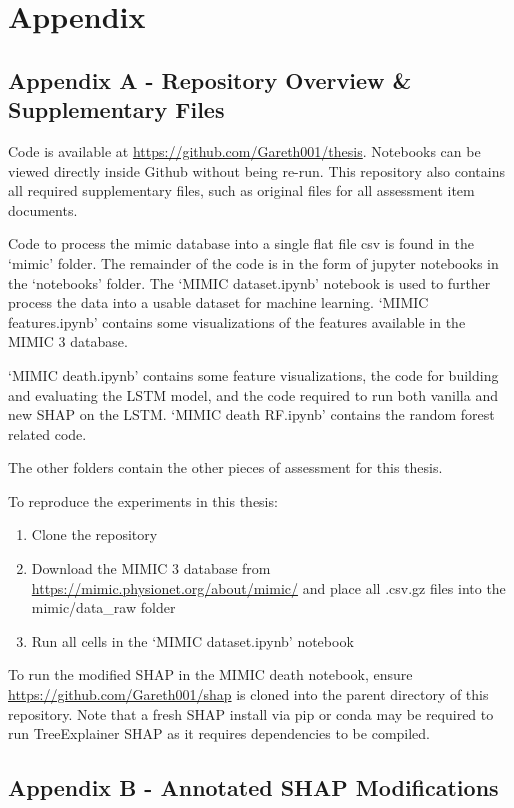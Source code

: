 \documentclass[12pt]{article}
\begin{document}
\section{Appendix}

\subsection{Appendix A - Repository Overview \& Supplementary Files}

Code is available at \url{https://github.com/Gareth001/thesis}. Notebooks can be viewed directly inside Github without being re-run. This repository also contains all required supplementary files, such as original files for all assessment item documents.

Code to process the mimic database into a single flat file csv is found in the `mimic' folder. The remainder of the code is in the form of jupyter notebooks in the `notebooks' folder. The `MIMIC dataset.ipynb' notebook is used to further process the data into a usable dataset for machine learning. `MIMIC features.ipynb' contains some visualizations of the features available in the MIMIC 3 database.

`MIMIC death.ipynb' contains some feature visualizations, the code for building and evaluating the LSTM model, and the code required to run both vanilla and new SHAP on the LSTM. `MIMIC death RF.ipynb' contains the random forest related code.

The other folders contain the other pieces of assessment for this thesis.

To reproduce the experiments in this thesis:
\begin{enumerate}
\item Clone the repository
\item Download the MIMIC 3 database from \url{https://mimic.physionet.org/about/mimic/} and place all .csv.gz files into the mimic/data\_raw folder
\item Run all cells in the `MIMIC dataset.ipynb' notebook
\end{enumerate}

To run the modified SHAP in the MIMIC death notebook, ensure \url{https://github.com/Gareth001/shap} is cloned into the parent directory of this repository. Note that a fresh SHAP install via pip or conda may be required to run TreeExplainer SHAP as it requires dependencies to be compiled. 

\subsection{Appendix B - Annotated SHAP Modifications}
\end{document}
